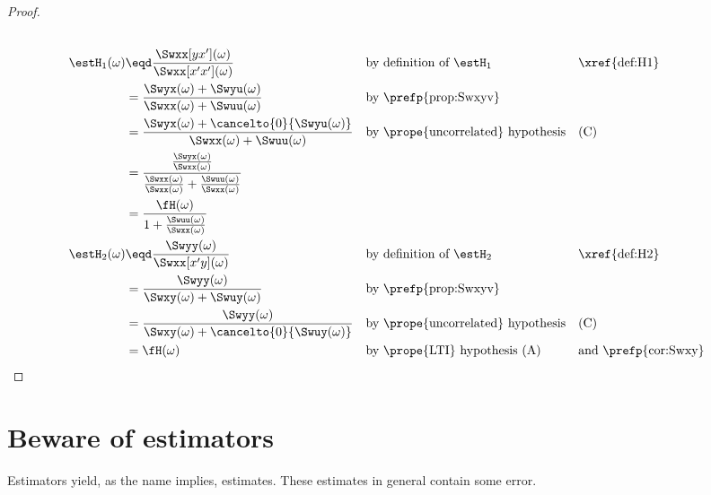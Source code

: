\begin{proof}
\begin{align*}
  \\
  \estH_1(\omega)
    &\eqd \frac{\Swxx[yx'](\omega)}{\Swxx[x'x'](\omega)}
    && \text{by definition of $\estH_1$}
    && \text{\xref{def:H1}}
  \\&= \frac{\Swyx(\omega) + \Swyu(\omega)}
            {\Swxx(\omega) + \Swuu(\omega)}
    && \text{by \prefp{prop:Swxyv}}
  \\&= \frac{\Swyx(\omega) + \cancelto{0}{\Swyu(\omega)}}
            {\Swxx(\omega) + \Swuu(\omega)}
    && \text{by \prope{uncorrelated} hypothesis}
    && \text{(C)}
  \\&= \frac{\frac{\Swyx(\omega)}{\Swxx(\omega)}}
            {\frac{\Swxx(\omega)}{\Swxx(\omega)} + \frac{\Swuu(\omega)}{\Swxx(\omega)}}
  \\&= \frac{\fH(\omega)}
            {1 + \frac{\Swuu(\omega)}{\Swxx(\omega)}}
  \\
  \estH_2(\omega)
    &\eqd \frac{\Swyy(\omega)}{\Swxx[x'y](\omega)}
    && \text{by definition of $\estH_2$}
    && \text{\xref{def:H2}}
  \\&= \frac{\Swyy(\omega)}{\Swxy(\omega) + \Swuy(\omega)}
    && \text{by \prefp{prop:Swxyv}}
  \\&= \frac{\Swyy(\omega)}{\Swxy(\omega) + \cancelto{0}{\Swuy(\omega)}}
    && \text{by \prope{uncorrelated} hypothesis}
    && \text{(C)}
  \\&= \fH(\omega)
    && \text{by \prope{LTI} hypothesis (A)}
    && \text{and \prefp{cor:Swxy}}
\end{align*}
\end{proof}

\section{Beware of estimators}
Estimators yield, as the name implies, estimates.
These estimates in general contain some error.

